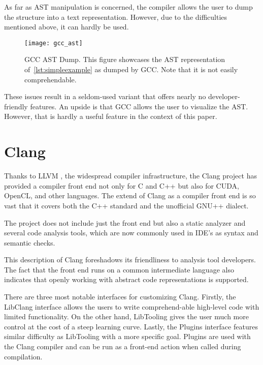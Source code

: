 As far as AST manipulation is concerned, the compiler allows the user to dump 
the structure into a text representation. 
However, due to the difficulties mentioned above, it can hardly be used.

\begin{figure}[p]\centering
\texttt{[image: gcc\_ast]}
\caption{GCC AST Dump. This figure showcases 
the AST representation of~\ref{lst:simpleexample}
as dumped by GCC. Note that it is not easily comprehendable.}
\label{img:gcc}
\end{figure}

These issues result in a seldom-used variant that offers nearly 
no developer-friendly features. 
An upside is that GCC allows the user to visualize the AST. 
However, that is hardly a useful feature in the context of this paper.

\section{Clang}

Thanks to LLVM \citep{llvm:online}, the widespread compiler infrastructure,
the Clang project \citep{clang:online}
has provided a compiler front end not only for C and C++ but also 
for CUDA, OpenCL, and other languages. 
The extend of Clang as a compiler front end is so vast that it covers 
both the C++ standard and the unofficial GNU++ dialect.

The project does not include just the front end but also a static analyzer 
and several code analysis tools, which are now commonly used in IDE's as 
syntax and semantic checks. 

This description of Clang foreshadows its friendliness to analysis tool developers. 
The fact that the front end runs on a common intermediate language also indicates 
that openly working with abstract code representations is supported.

There are three most notable interfaces for customizing Clang. 
Firstly, the LibClang interface allows the users to write 
comprehend-able high-level code with limited functionality. 
On the other hand, LibTooling gives the user much more control 
at the cost of a steep learning curve. 
Lastly, the Plugins interface features similar difficulty 
as LibTooling with a more specific goal. 
Plugins are used with the Clang compiler and can be run 
as a front-end action when called during compilation.


